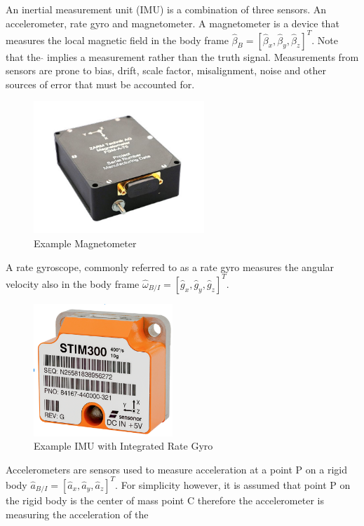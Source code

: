 \documentclass{article}
\begin{document}
An inertial measurement unit (IMU) is a combination of three
sensors. An accelerometer, rate gyro and magnetometer. A magnetometer
is a device that measures the local magnetic field in the body frame
$\hat{\beta}_{B} = [\hat{\beta}_x,\hat{\beta}_y,\hat{\beta}_z]^T$\cite{qp33}. Note that the $\hat{}$ implies a measurement rather than the truth signal. Measurements from sensors are prone to bias, drift, scale factor, misalignment, noise and other sources of error that must be accounted for.
\begin{figure}[H]
  \begin{center}
  \includegraphics[height=50mm]{Figures/Magnetometer}
  \end{center}
  \caption{Example Magnetometer \cite{qp34}}
\end{figure}
A rate gyroscope, commonly referred to as a rate gyro measures the
angular velocity also in the body frame $\hat{\omega}_{B/I}=[\hat{g}_x,\hat{g}_y,\hat{g}_z]^T$. 
\begin{figure}[H]
  \begin{center}
  \includegraphics[height=50mm]{Figures/RateGyro}
  \end{center}
  \caption{Example IMU with Integrated Rate Gyro \cite{qp35}}
\end{figure}
Accelerometers are sensors used to measure acceleration at a point P
on a rigid body $\hat{a}_{B/I}=[\hat{a}_x,\hat{a}_y,\hat{a}_z]^T$. For simplicity however, it
is assumed that point P on the rigid body is the center of mass point
C therefore the accelerometer is measuring the acceleration of the
\end{document}
